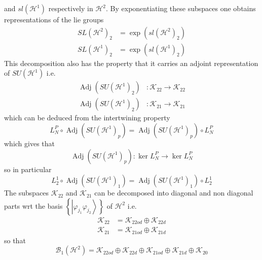\documentclass[aps,preprint]{revtex4}%
\begin{document}
and $sl\left(  \mathcal{H}^{1}\right)  $ respectively in $\mathcal{H}^{2}.$ By
exponentiating these subspaces one obtains representations of the lie groups
\begin{align}
SL\left(  \mathcal{H}^{2}\right)  _{2} &  =\exp\left(  sl\left(
\mathcal{H}^{2}\right)  _{2}\right)  \nonumber\\
SL\left(  \mathcal{H}^{1}\right)  _{2} &  =\exp\left(  sl\left(
\mathcal{H}^{1}\right)  _{2}\right)
\end{align}
This decomposition also has the property that it carries an adjoint
representation of $SU\left(  \mathcal{H}^{1}\right)  $ i.e.%
\begin{align}
\operatorname{Adj}\left(  SU\left(  \mathcal{H}^{1}\right)  _{2}\right)   &
:\mathcal{K}_{22}\rightarrow\mathcal{K}_{22}\nonumber\\
\operatorname{Adj}\left(  SU\left(  \mathcal{H}^{1}\right)  _{2}\right)   &
:\mathcal{K}_{21}\rightarrow\mathcal{K}_{21}%
\end{align}
which can be deduced from the intertwining property
\begin{equation}
L_{N}^{P}\circ\operatorname{Adj}\left(  SU\left(  \mathcal{H}^{1}\right)
_{p}\right)  =\operatorname{Adj}\left(  SU\left(  \mathcal{H}^{1}\right)
_{p}\right)  \circ L_{N}^{P}%
\end{equation}
which gives that
\begin{equation}
\operatorname{Adj}\left(  SU\left(  \mathcal{H}^{1}\right)  _{p}\right)  :\ker
L_{N}^{P}\rightarrow\ker L_{N}^{P}%
\end{equation}
so in particular
\begin{equation}
L_{2}^{1}\circ\operatorname{Adj}\left(  SU\left(  \mathcal{H}^{1}\right)
_{1}\right)  =\operatorname{Adj}\left(  SU\left(  \mathcal{H}^{1}\right)
_{1}\right)  \circ L_{2}^{1}%
\end{equation}
The subspaces $\mathcal{K}_{22}$ and $\mathcal{K}_{21}$ can be decomposed into
diagonal and non diagonal parts wrt the basis $\left\{  \left\vert
\varphi_{j_{1}}\varphi_{j_{2}}\right\rangle \right\}  $ of $\mathcal{H}^{2}$
i.e.
\begin{align}
\mathcal{K}_{22} &  =\mathcal{K}_{22od}\oplus\mathcal{K}_{22d}\nonumber\\
\mathcal{K}_{21} &  =\mathcal{K}_{21od}\oplus\mathcal{K}_{21d}%
\end{align}
so that
\begin{equation}
\mathcal{B}_{1}\left(  \mathcal{H}^{2}\right)  =\mathcal{K}_{22od}%
\oplus\mathcal{K}_{22d}\oplus\mathcal{K}_{21od}\oplus\mathcal{K}_{21d}%
\oplus\mathcal{K}_{20}%
\end{equation}
\end{document}
